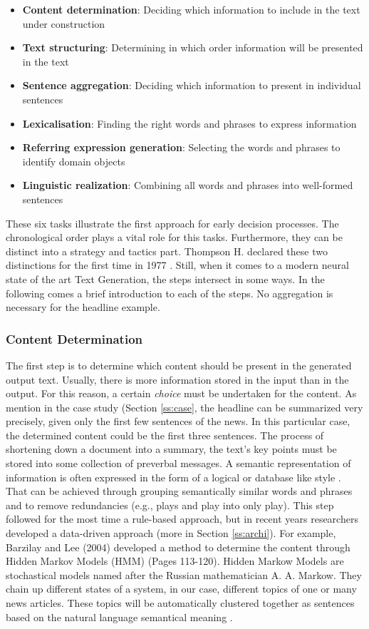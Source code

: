 \begin{itemize}
	\item \textbf{Content determination}: Deciding which information to include in the text under construction
	\item \textbf{Text structuring}: Determining in which order information will be presented in the text
	\item \textbf{Sentence aggregation}: Deciding which information to present in individual sentences
	\item \textbf{Lexicalisation}: Finding the right words and phrases to express information
	\item \textbf{Referring expression generation}: Selecting the words and phrases to identify domain objects
	\item \textbf{Linguistic realization}: Combining all words and phrases into well-formed sentences
\end{itemize}

These six tasks illustrate the first approach for early decision processes. 
The chronological order plays a vital role for this tasks. Furthermore, they can be distinct into a strategy and tactics part.
Thompson H. declared these two distinctions for the first time in 1977 \cite{thompson}. Still, when it comes to a modern neural state of the art Text Generation, the steps intersect in some ways. In the following comes a brief introduction to each of the steps. No aggregation is necessary for the headline example.

\subsubsection{Content Determination}\label{ss:content}

The first step is to determine which content should be present in the generated output text. Usually, there is more information stored in the input than in the output. For this reason, a certain \textit{choice} must be undertaken for the content. As mention in the case study (Section \ref{ss:case}, the headline can be summarized very precisely, given only the first few sentences of the news. In this particular case, the determined content could be the first three sentences. 
The process of shortening down a document into a summary, the text's key points must be stored into some collection of preverbal messages.
A semantic representation of information is often expressed in the form of a logical or database like style \cite{gatt}. That can be achieved through grouping semantically similar words and phrases and to remove redundancies (e.g., plays and play into only play). 
This step followed for the most time a rule-based approach, but in recent years researchers developed a data-driven approach (more in Section \ref{ss:archi}). For example, Barzilay and Lee (2004) developed a method to determine the content through Hidden Markov Models (HMM) \cite{lee} (Pages 113-120). Hidden Markow Models are stochastical models named after the Russian mathematician A. A. Markow. They chain up different states of a system, in our case, different topics of one or many news articles. These topics will be automatically clustered together as sentences based on the natural language semantical meaning \cite{gatt}. 

